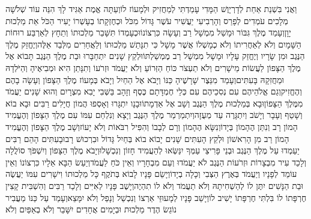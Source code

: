 \documentclass[../main/main.tex]{subfiles}
\begin{document}
\begin{multicols*}{\ncols}
וַאֲנִי בִּשְׁנַת אַחַת לְדָרְיָוֶשׁ הַמָּדִי עָמַדְתִּי\SubEnd{} לְמַחֲזִיק וּלְמָעוֹז לוֹ\PreVerseSpace{}וְעַתָּה אֱמֶת אַגִּיד לָךְ הִנֵּה עוֹד שְׁלֹשָׁה מְלָכִים עֹמְדִים לְפָרַס וְהָרְבִיעִי יַעֲשִׁיר עֹשֶׁר גָּדוֹל מִכֹּל וּכְחֶזְקָתוֹ בְעָשְׁרוֹ יָעִיר הַכֹּל אֵת מַלְכוּת יָוָן\PreVerseSpace{}וְעָמַד מֶלֶךְ גִּבּוֹר וּמָשַׁל מִמְשָׁל רַב וְעָשָׂה כִּרְצוֹנוֹ\PreVerseSpace{}וּכְעָמְדוֹ תִּשָּׁבֵר מַלְכוּתוֹ וְתֵחָץ לְאַרְבַּע רוּחוֹת הַשָּׁמָיִם וְלֹא לְאַחֲרִיתוֹ וְלֹא כְמָשְׁלוֹ אֲשֶׁר מָשָׁל כִּי תִנָּתֵשׁ מַלְכוּתוֹ וְלַאֲחֵרִים מִלְּבַד אֵלֶּה\PreVerseSpace{}וְיֶחֱזַק מֶלֶךְ הַנֶּגֶב וּמִן שָׂרָיו וְיֶחֱזַק עָלָיו וּמָשָׁל מִמְשָׁל רַב מֶמְשַׁלְתּוֹ\PreVerseSpace{}וּלְקֵץ שָׁנִים יִתְחַבָּרוּ וּבַת מֶלֶךְ הַנֶּגֶב תָּבוֹא אֶל מֶלֶךְ הַצָּפוֹן לַעֲשׂוֹת מֵישָׁרִים וְלֹא תַעְצֹר כּוֹחַ הַזְּרוֹעַ וְלֹא יַעֲמֹד וּזְרֹעוֹ וְתִנָּתֵן הִיא וּמְבִיאֶיהָ וְהַיֹּלְדָהּ וּמַחֲזִקָהּ בָּעִתִּים\PreVerseSpace{}וְעָמַד מִנֵּצֶר שָׁרָשֶׁיהָ כַּנּוֹ וְיָבֹא אֶל הַחַיִל וְיָבֹא בְּמָעוֹז מֶלֶךְ הַצָּפוֹן וְעָשָׂה בָהֶם וְהֶחֱזִיק\PreVerseSpace{}וְגַם אֱלֹהֵיהֶם עִם נְסִכֵיהֶם עִם כְּלֵי חֶמְדָּתָם כֶּסֶף וְזָהָב בַּשְּׁבִי יָבִא מִצְרָיִם וְהוּא שָׁנִים יַעֲמֹד מִמֶּלֶךְ הַצָּפוֹן\PreVerseSpace{}וּבָא בְּמַלְכוּת מֶלֶךְ הַנֶּגֶב וְשָׁב אֶל אַדְמָתוֹ\PreVerseSpace{}וּבָנָו יִתְגָּרוּ וְאָסְפוּ הֲמוֹן חֲיָלִים רַבִּים וּבָא בוֹא וְשָׁטַף וְעָבָר וְיָשֹׁב וְיִתְגָּרֶה\SubEnd{} עַד מְעֻזָה\PreVerseSpace{}וְיִתְמַרְמַר מֶלֶךְ הַנֶּגֶב וְיָצָא וְנִלְחַם עִמּוֹ עִם מֶלֶךְ הַצָּפוֹן וְהֶעֱמִיד הָמוֹן רָב וְנִתַּן הֶהָמוֹן בְּיָדוֹ\PreVerseSpace{}וְנִשָּׂא הֶהָמוֹן וְרָם\SubEnd{} לְבָבוֹ וְהִפִּיל רִבֹּאוֹת וְלֹא יָעוֹז\PreVerseSpace{}וְשָׁב מֶלֶךְ הַצָּפוֹן וְהֶעֱמִיד הָמוֹן רַב מִן הָרִאשׁוֹן וּלְקֵץ הָעִתִּים שָׁנִים יָבוֹא בוֹא בְּחַיִל גָּדוֹל וּבִרְכוּשׁ רָב\PreVerseSpace{}וּבָעִתִּים הָהֵם רַבִּים יַעַמְדוּ עַל מֶלֶךְ הַנֶּגֶב וּבְנֵי פָּרִיצֵי עַמְּךָ יִנַּשְּׂאוּ לְהַעֲמִיד חָזוֹן וְנִכְשָׁלוּ\PreVerseSpace{}וְיָבֹא מֶלֶךְ הַצָּפוֹן וְיִשְׁפֹּךְ סוֹלֲלָה וְלָכַד עִיר מִבְצָרוֹת וּזְרֹעוֹת הַנֶּגֶב לֹא יַעֲמֹדוּ וְעַם מִבְחָרָיו וְאֵין כֹּחַ לַעֲמֹד\PreVerseSpace{}וְיַעַשׂ הַבָּא אֵלָיו כִּרְצוֹנוֹ וְאֵין עוֹמֵד לְפָנָיו וְיַעֲמֹד בְּאֶרֶץ הַצְּבִי וְכָלָה בְיָדוֹ\PreVerseSpace{}וְיָשֵׂם פָּנָיו לָבוֹא בְּתֹקֶף כָּל מַלְכוּתוֹ וִישָׁרִים עִמּוֹ יַעֲשֶׂה\SubEnd{} וּבַת הַנָּשִׁים יִתֶּן לוֹ לְהַשְׁחִיתָהּ וְלֹא תַעֲמֹד וְלֹא לוֹ תִהְיֶה\PreVerseSpace{}וְיָשֶׁב פָּנָיו לְאִיִּים וְלָכַד רַבִּים וְהִשְׁבִּית קָצִין חֶרְפָּתוֹ לוֹ בִּלְתִּי חֶרְפָּתוֹ יָשִׁיב לוֹ\PreVerseSpace{}וְיָשֵׁב פָּנָיו לְמָעוּזֵּי אַרְצוֹ וְנִכְשַׁל וְנָפַל וְלֹא יִמָּצֵא\PreVerseSpace{}וְעָמַד עַל כַּנּוֹ מַעֲבִיר נוֹגֵשׂ הֶדֶר מַלְכוּת וּבְיָמִים אֲחָדִים יִשָּׁבֵר וְלֹא בְאַפַּיִם וְלֹא 
\end{multicols*}
\end{document}
